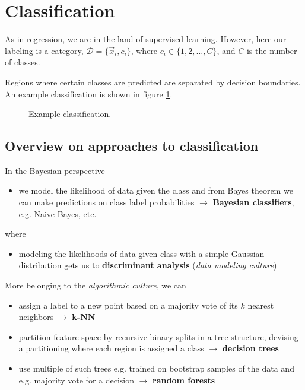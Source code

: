 \section{Classification}
\thispagestyle{plain}

As in regression, we are in the land of supervised learning. However,
here our labeling is a category, $\mathcal{D} = \{ \vec{x}_i, c_i \}$,
where $c_i \in \{1, 2, \ldots, C\}$, and $C$ is the number of classes.


Regions where certain classes are predicted are separated by
decision boundaries. An example classification is shown in
figure \ref{fig:classification}.

\begin{figure}[H]
  \centering
  
  \caption{Example classification.}
  \label{fig:classification}
\end{figure}

\subsection{Overview on approaches to classification}
In the Bayesian perspective
\begin{itemize}
    \item we model the likelihood of data given the class and from Bayes theorem we can make predictions on class label probabilities $\rightarrow$ \textbf{Bayesian classifiers}, e.g. Naive Bayes, etc.
\end{itemize}
where
\begin{itemize}
    \item modeling the likelihoods of data given class with a simple Gaussian distribution gets us to \textbf{discriminant analysis} (\textit{data modeling culture})
\end{itemize}

More belonging to the \textit{algorithmic culture}, we can
\begin{itemize}
    \item assign a label to a new point based on a majority vote of its $k$ nearest neighbors $\rightarrow$ \textbf{k-NN}
    \item partition feature space by recursive binary splits in a tree-structure, devising a partitioning where each region is assigned a class $\rightarrow$ \textbf{decision trees}
    \item use multiple of such trees e.g. trained on bootstrap samples of the data and e.g. majority vote for a decision $\rightarrow$ \textbf{random forests}
\end{itemize}

